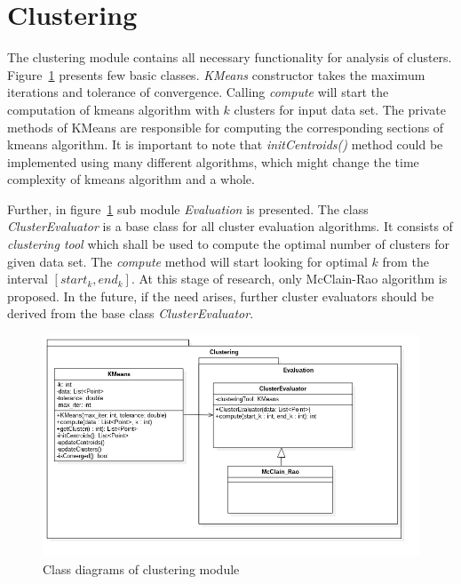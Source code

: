 \documentclass{mini}
\begin{document}
\section{Clustering}

The clustering module contains all necessary functionality for analysis of clusters. Figure~\ref{fig:clustering_class} presents few basic classes. \textit{KMeans} constructor takes the maximum iterations and tolerance of convergence. Calling \textit{compute} will start the computation of kmeans algorithm with $k$ clusters for input data set. The private methods of KMeans are responsible for computing the corresponding sections of kmeans algorithm. It is important to note that \textit{initCentroids()} method could be implemented using many different algorithms, which might change the time complexity of kmeans algorithm and a whole.

Further, in figure~\ref{fig:clustering_class} sub module \textit{Evaluation} is presented. The class \textit{ClusterEvaluator} is a base class for all cluster evaluation algorithms. It consists of \textit{clustering tool} which shall be used to compute the optimal number of clusters for given data set. The \textit{compute} method will start looking for optimal $k$ from the interval $[start_k, end_k]$. At this stage of research, only McClain-Rao algorithm is proposed. In the future, if the need arises, further cluster evaluators should be derived from the base class \textit{ClusterEvaluator}.

%
%
\begin{figure}[H]
    \centering
    \includegraphics[width=1.0\textwidth]{../uml/classes/clustering.jpg}
    \caption{Class diagrams of clustering module}
    \label{fig:clustering_class}
\end{figure}
\end{document}
